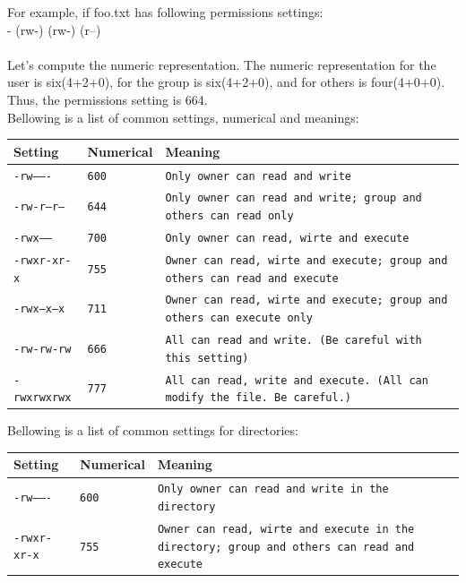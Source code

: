 For example, if foo.txt has following permissions settings:\\
- (rw-) (rw-) (r--) \\
\\
Let's compute the numeric representation. The numeric representation for the user is six(4+2+0), for the group is six(4+2+0), and for others is four(4+0+0). Thus, the permissions setting is 664.\\

Bellowing is a list of common settings, numerical and meanings:
\begin{center}
	\begin{tabular}{ p{2cm}  p{3cm}  p{7cm}}
		\toprule
		\textbf{Setting} & \textbf{Numerical} & \textbf{Meaning} \\
		\midrule
		\texttt{-rw-------} & \texttt{600} & \texttt{Only owner can read and write} \\
		\midrule
		\texttt{-rw-r--r--} & \texttt{644} & \texttt{Only owner can read and write; group and others can read only} \\
		\midrule
		\texttt{-rwx------} & \texttt{700} & \texttt{Only owner can read, wirte and execute} \\
		\midrule
		\texttt{-rwxr-xr-x} & \texttt{755} & \texttt{Owner can read, wirte and execute; group and others can read and execute} \\
		\midrule
		\texttt{-rwx--x--x} & \texttt{711} & \texttt{Owner can read, wirte and execute; group and others can execute only} \\
		\midrule
		\texttt{-rw-rw-rw} & \texttt{666} & \texttt{All can read and write. (Be careful with this setting)} \\
		\midrule
		\texttt{-rwxrwxrwx} & \texttt{777} & \texttt{All can read, write and execute. (All can modify the file. Be careful.)} \\
		\bottomrule
	\end{tabular}
\end{center}

Bellowing is a list of common settings for directories:
 \begin{center}
	\begin{tabular}{ p{2cm}  p{3cm}  p{7cm}}
		\toprule
		\textbf{Setting} & \textbf{Numerical} & \textbf{Meaning} \\
		\midrule
		\texttt{-rw-------} & \texttt{600} & \texttt{Only owner can read and write in the directory} \\
		\midrule
		\texttt{-rwxr-xr-x} & \texttt{755} & \texttt{Owner can read, wirte and execute in the directory; group and others can read and execute} \\
		\bottomrule
	\end{tabular}
\end{center}


